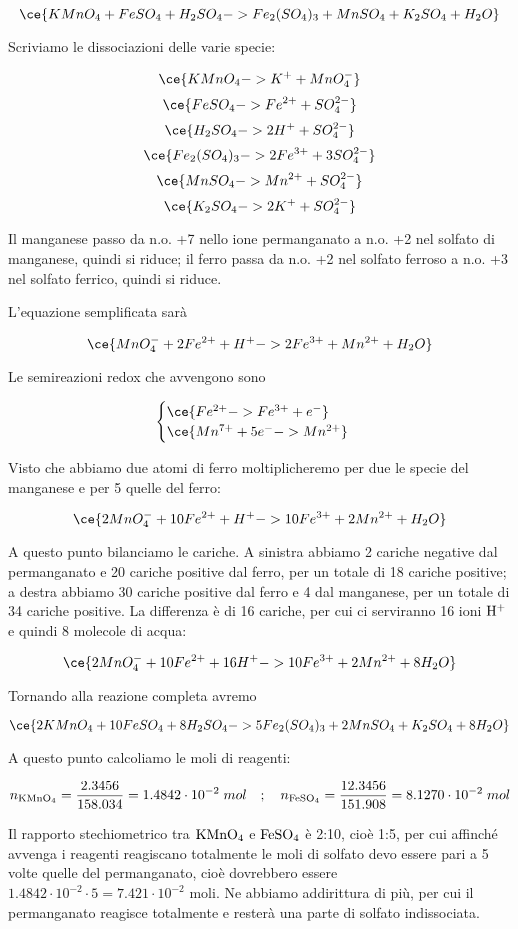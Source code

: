 $$\ce{KMnO_4 + FeSO_4 + H_2SO_4 -> Fe_2(SO_4)_3 + MnSO_4 + K_2SO_4 + H_2O}$$

Scriviamo le dissociazioni delle varie specie:

$$\ce{KMnO_4 -> K^+ + MnO_4^-}$$
$$\ce{FeSO_4 -> Fe^{2+} + SO_4^{2-}}$$
$$\ce{H_2SO_4 -> 2H^+ + SO_4^{2-}}$$
$$\ce{Fe_2(SO_4)_3 -> 2Fe^{3+} + 3SO_4^{2-}}$$
$$\ce{MnSO_4 -> Mn^{2+} + SO_4^{2-}}$$
$$\ce{K_2SO_4 -> 2K^+ + SO_4^{2-}}$$

Il manganese passo da n.o. +7 nello ione permanganato a n.o. +2 nel solfato di manganese, quindi si riduce; il ferro passa da n.o. +2 nel solfato ferroso a n.o. +3 nel solfato ferrico, quindi si riduce.

L'equazione semplificata sarà

$$\ce{MnO_4^- + 2Fe^{2+} + H^+ -> 2Fe^{3+} + Mn^{2+} + H_2O}$$

Le semireazioni redox che avvengono sono

$$\begin{cases}
    \ce{Fe^{2+} -> Fe^{3+} + e^-}\\
    \ce{Mn^{7+} + 5e^- -> Mn^{2+}}
\end{cases}$$

Visto che abbiamo due atomi di ferro moltiplicheremo per due le specie del manganese e per 5 quelle del ferro:

$$\ce{2MnO_4^- + 10Fe^{2+} + H^+ -> 10Fe^{3+} + 2Mn^{2+} + H_2O}$$

A questo punto bilanciamo le cariche. A sinistra abbiamo 2 cariche negative dal permanganato e 20 cariche positive dal ferro, per un totale di 18 cariche positive; a destra abbiamo 30 cariche positive dal ferro e 4 dal manganese, per un totale di 34 cariche positive. La differenza è di 16 cariche, per cui ci serviranno 16 ioni $\rm H^+$ e quindi 8 molecole di acqua:

$$\ce{2MnO_4^- + 10Fe^{2+} + 16H^+ -> 10Fe^{3+} + 2Mn^{2+} + 8H_2O}$$

Tornando alla reazione completa avremo

$$\ce{2KMnO_4 + 10FeSO_4 + 8H_2SO_4 -> 5Fe_2(SO_4)_3 + 2MnSO_4 + K_2SO_4 + 8H_2O}$$

A questo punto calcoliamo le moli di reagenti:

$$n_{\rm KMnO_4}=\frac{2.3456}{158.034}
=1.4842 \cdot 10^{-2}\;mol
\quad;\quad
n_{\rm FeSO_4}=\frac{12.3456}{151.908}
=8.1270 \cdot 10^{-2}\;mol$$

Il rapporto stechiometrico tra $\rm KMnO_4$ e $\rm FeSO_4$ è 2:10, cioè 1:5, per cui affinché avvenga i reagenti reagiscano totalmente le moli di solfato devo essere pari a 5 volte quelle del permanganato, cioè dovrebbero essere $1.4842 \cdot 10^{-2} \cdot 5=7.421 \cdot 10^{-2}$ moli. Ne abbiamo addirittura di più, per cui il permanganato reagisce totalmente e resterà una parte di solfato indissociata.

